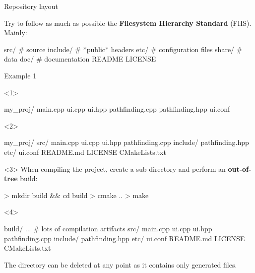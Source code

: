 \documentclass[compress]{beamer}
\begin{document}
\begin{frame}[fragile]{Repository layout}

Try to follow as much as possible the {\bf Filesystem Hierarchy
 Standard} (FHS). Mainly:

\begin{shcode}
src/        # source
include/    # *public* headers
etc/        # configuration files
share/      # data
doc/        # documentation
README
LICENSE
\end{shcode}

\centering


\end{frame}


\begin{frame}[fragile]{Example 1}

\begin{onlyenv}<1>
\begin{shcode}
my_proj/
  main.cpp
  ui.cpp
  ui.hpp
  pathfinding.cpp
  pathfinding.hpp
  ui.conf
\end{shcode}

\end{onlyenv}

\begin{onlyenv}<2>
\begin{shcode}
my_proj/
  src/
    main.cpp
    ui.cpp
    ui.hpp
    pathfinding.cpp
  include/
    pathfinding.hpp
  etc/
    ui.conf
  README.md
  LICENSE
  CMakeLists.txt
\end{shcode}

\end{onlyenv}

\begin{onlyenv}<3>
When compiling the project, create a sub-directory  and perform an
    \textbf{out-of-tree} build:

\begin{shcode}
> mkdir build && cd build
> cmake ..
> make
\end{shcode}

\end{onlyenv}

\begin{onlyenv}<4>

\begin{shcode}
build/
  ... # lots of compilation artifacts
src/
  main.cpp
  ui.cpp
  ui.hpp
  pathfinding.cpp
include/
  pathfinding.hpp
etc/
  ui.conf
README.md
LICENSE
CMakeLists.txt
\end{shcode}

    The  directory can be deleted at any point as it contains only
    generated files.
\end{onlyenv}
\end{frame}
\end{document}

